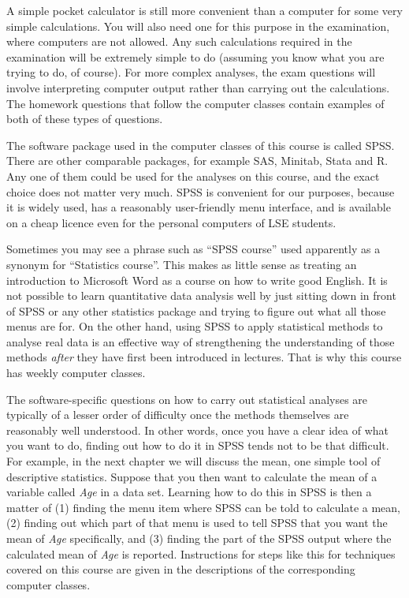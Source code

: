 A simple pocket calculator is still more convenient than a
computer for some very simple calculations. You will also need one for
this purpose in the examination, where computers are not allowed. Any
such calculations required in the examination will be extremely simple
to do (assuming you know what you are trying to do, of course). For more
complex analyses, the exam questions will involve interpreting computer
output rather than carrying out the calculations. The homework questions
that follow the computer classes contain examples of both of these types of
questions.

The software package used in the computer classes of this course is
called SPSS. There are other comparable packages, for
example SAS, Minitab, Stata and R. Any one of them could be used for the
analyses on this course, and the exact choice does not matter very much.
SPSS is convenient for our purposes, because it is widely used,
has a reasonably user-friendly menu interface, and is available on a
cheap licence even for the personal computers of LSE students.

Sometimes you may see a phrase such as ``SPSS course'' used apparently
as a synonym for ``Statistics course''. This makes as little sense as
treating an introduction to Microsoft Word as a course on how to write
good English. It is not possible to learn quantitative data analysis
well by just sitting down in front of SPSS or any other statistics
package and trying to figure out what all those menus are for. On the
other hand, using SPSS to apply statistical methods to analyse real data
is an effective way of strengthening the understanding of
those methods \emph{after} they have first been introduced in lectures.
That is why this course has weekly computer classes.

The software-specific questions on how to carry out statistical analyses are
typically of a lesser order of difficulty once the methods
themselves are reasonably well understood. In other words, once you have
a clear idea of what you want to do, finding out how to do it in SPSS
tends not to be that difficult. For example, in the next chapter we will
discuss the mean, one simple tool of descriptive statistics. Suppose
that you then want to calculate the mean of a variable called \emph{Age}
in a data set. Learning how to do this in SPSS is then a matter of (1)
finding the menu item where SPSS can be told to calculate a mean, (2)
finding out which part of that menu is used to tell SPSS that you want
the mean of \emph{Age} specifically, and (3) finding the part of the
SPSS output where the calculated mean of \emph{Age} is reported.
Instructions for steps like this for techniques covered on this course
are given in the descriptions of the corresponding computer classes.

